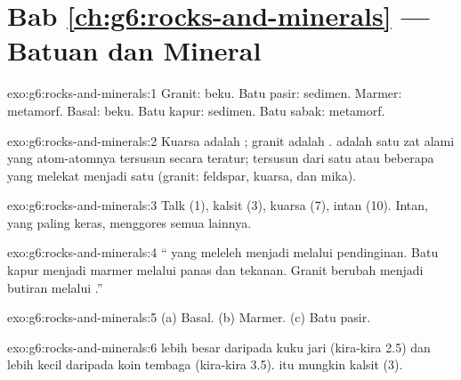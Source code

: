 \section*{Bab \ref{ch:g6:rocks-and-minerals} --- Batuan dan Mineral}

\begin{solution}{exo:g6:rocks-and-minerals:1}
Granit: beku. Batu pasir: sedimen. Marmer: metamorf. Basal: beku. Batu
kapur: sedimen. Batu sabak: metamorf.
\end{solution}

\begin{solution}{exo:g6:rocks-and-minerals:2}
Kuarsa adalah ; granit adalah .  adalah satu zat alami
yang atom-atomnya tersusun secara teratur;  tersusun dari satu atau
beberapa  yang melekat menjadi satu (granit: feldspar, kuarsa, dan
mika).
\end{solution}

\begin{solution}{exo:g6:rocks-and-minerals:3}
Talk (1), kalsit (3), kuarsa (7), intan (10). Intan, yang paling keras,
menggores semua  lainnya.
\end{solution}

\begin{solution}{exo:g6:rocks-and-minerals:4}
`` yang meleleh menjadi  melalui pendinginan. Batu kapur
menjadi marmer melalui panas dan tekanan. Granit berubah menjadi butiran
 melalui .''
\end{solution}

\begin{solution}{exo:g6:rocks-and-minerals:5}
(a) Basal. (b) Marmer. (c) Batu pasir.
\end{solution}

\begin{solution}{exo:g6:rocks-and-minerals:6}
 lebih besar daripada  kuku jari (kira-kira 2.5) dan
lebih kecil daripada  koin tembaga (kira-kira 3.5).  itu
mungkin kalsit (3).
\end{solution}

